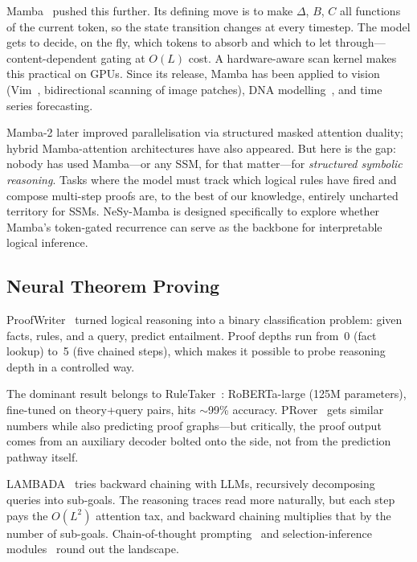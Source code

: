 \documentclass[conference]{IEEEtran}
\DeclareRobustCommand{\model}{NeSy-Mamba}
\begin{document}
Mamba~\cite{gu2023mamba} pushed this further. Its defining move is
to make $\Delta$, $B$, $C$ all functions of the current token, so
the state transition changes at every timestep. The model gets to
decide, on the fly, which tokens to absorb and which to let
through---content-dependent gating at $O(L)$ cost. A hardware-aware
scan kernel makes this practical on GPUs. Since its release, Mamba
has been applied to vision (Vim~\cite{zhu2024vim}, bidirectional
scanning of image patches), DNA modelling~\cite{gu2023mamba}, and
time series forecasting.

Mamba-2 later improved parallelisation via structured masked
attention duality; hybrid Mamba-attention architectures have also
appeared.  But here is the gap: nobody has used Mamba---or any SSM,
for that matter---for \emph{structured symbolic reasoning}. Tasks
where the model must track which logical rules have fired and
compose multi-step proofs are, to the best of our knowledge,
entirely uncharted territory for SSMs.  \model{} is designed
specifically to explore whether Mamba's token-gated recurrence
can serve as the backbone for interpretable logical inference.

\subsection{Neural Theorem Proving}

ProofWriter~\cite{tafjord2021proofwriter} turned logical reasoning
into a binary classification problem: given facts, rules, and a
query, predict entailment. Proof depths run from~0 (fact lookup)
to~5 (five chained steps), which makes it possible to probe
reasoning depth in a controlled way.

The dominant result belongs to RuleTaker~\cite{clark2020ruletaker}:
RoBERTa-large (125M parameters), fine-tuned on theory+query pairs,
hits $\sim$99\% accuracy. PRover~\cite{saha2020prover} gets similar
numbers while also predicting proof graphs---but critically, the
proof output comes from an auxiliary decoder bolted onto the side,
not from the prediction pathway itself.

LAMBADA~\cite{kazemi2023lambada} tries backward chaining with LLMs,
recursively decomposing queries into sub-goals. The reasoning traces
read more naturally, but each step pays the $O(L^2)$ attention
tax, and backward chaining multiplies that by the number of
sub-goals. Chain-of-thought prompting~\cite{wei2022chain} and
selection-inference modules~\cite{creswell2022selection} round out
the landscape.
\end{document}
